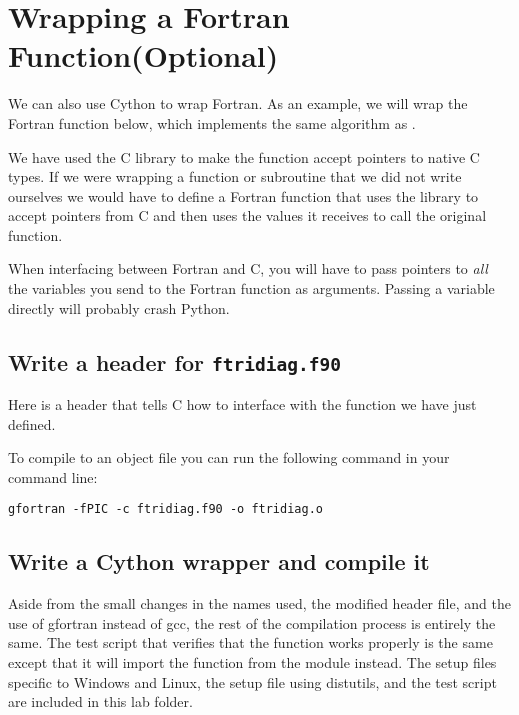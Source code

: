 \section*{Wrapping a Fortran Function(Optional)}
We can also use Cython to wrap Fortran.
As an example, we will wrap the Fortran function below, which implements the same algorithm as .

We have used the C library  to make the function accept pointers to native C types.
If we were wrapping a function or subroutine that we did not write ourselves we would have to define a Fortran function that uses the  library to accept pointers from C and then uses the values it receives to call the original function.


\begin{warn}
When interfacing between Fortran and C, you will have to pass pointers to \emph{all} the variables you send to the Fortran function as arguments.
Passing a variable directly will probably crash Python.
\end{warn}

\subsection*{Write a header for \texttt{ftridiag.f90}}
Here is a header that tells C how to interface with the function we have just defined.


To compile  to an object file you can run the following command in your command line:
\begin{lstlisting}[style=ShellInput]
gfortran -fPIC -c ftridiag.f90 -o ftridiag.o
\end{lstlisting}

\subsection*{Write a Cython wrapper and compile it}

Aside from the small changes in the names used, the modified header file, and the use of gfortran instead of gcc, the rest of the compilation process is entirely the same.
The test script that verifies that the function works properly is the same except that it will import the function from the module  instead.
The setup files specific to Windows and Linux, the setup file using distutils, and the test script are included in this lab folder.

